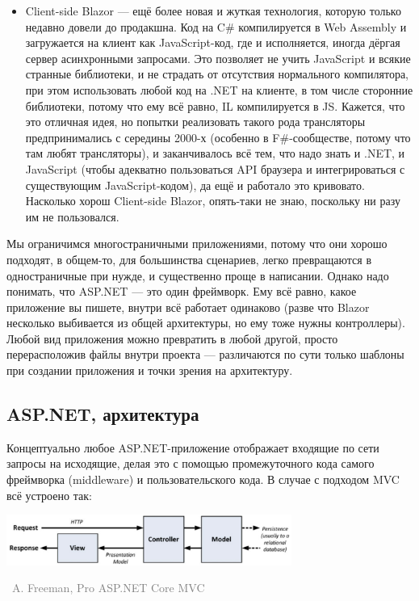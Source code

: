 \documentclass[a5paper]{article}
\newcommand{\attribution}[1] {
\vspace{-5mm}\begin{flushright}\begin{scriptsize}\textcolor{gray}{\textcopyright\, #1}\end{scriptsize}\end{flushright}
}
\begin{document}
\begin{itemize}
\begin{itemize}
        \item Client-side Blazor --- ещё более новая и жуткая технология, которую только недавно довели до продакшна. Код на C\# компилируется в Web Assembly и загружается на клиент как JavaScript-код, где и исполняется, иногда дёргая сервер асинхронными запросами. Это позволяет не учить JavaScript и всякие странные библиотеки, и не страдать от отсутствия нормального компилятора, при этом использовать любой код на .NET на клиенте, в том числе сторонние библиотеки, потому что ему всё равно, IL компилируется в JS. Кажется, что это отличная идея, но попытки реализовать такого рода трансляторы предпринимались с середины 2000-х (особенно в F\#-сообществе, потому что там любят трансляторы), и заканчивалось всё тем, что надо знать и .NET, и JavaScript (чтобы адекватно пользоваться API браузера и интегрироваться с существующим JavaScript-кодом), да ещё и работало это кривовато. Насколько хорош Client-side Blazor, опять-таки не знаю, поскольку ни разу им не пользовался.
    \end{itemize}
\end{itemize}

Мы ограничимся многостраничными приложениями, потому что они хорошо подходят, в общем-то, для большинства сценариев, легко превращаются в одностраничные при нужде, и существенно проще в написании. Однако надо понимать, что ASP.NET --- это один фреймворк. Ему всё равно, какое приложение вы пишете, внутри всё работает одинаково (разве что Blazor несколько выбивается из общей архитектуры, но ему тоже нужны контроллеры). Любой вид приложения можно превратить в любой другой, просто перерасположив файлы внутри проекта --- различаются по сути только шаблоны при создании приложения и точки зрения на архитектуру.

\subsection{ASP.NET, архитектура}

Концептуально любое ASP.NET-приложение отображает входящие по сети запросы на исходящие, делая это с помощью промежуточного кода самого фреймворка (middleware) и пользовательского кода. В случае с подходом MVC всё устроено так:

\pagebreak

\begin{center}
    \includegraphics[width=0.7\textwidth]{mvc.png}
    \attribution{A. Freeman, Pro ASP.NET Core MVC}
\end{center}
\end{document}

